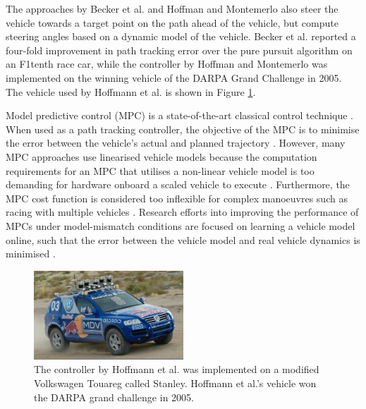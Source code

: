 The approaches by Becker et al. \cite{Becker2022} and Hoffman and Montemerlo \cite{Hoffmann2007} also steer the vehicle towards a target point on the path ahead of the vehicle, but compute steering angles based on a dynamic model of the vehicle.
Becker et al. \cite{Becker2022} reported a four-fold improvement in path tracking error over the pure pursuit algorithm on an F1tenth race car, while the controller by Hoffman and Montemerlo \cite{Hoffmann2007} was implemented on the winning vehicle of the DARPA Grand Challenge in 2005.
The vehicle used by Hoffmann et al.  \cite{Hoffmann2007} is shown in Figure \ref{fig:stanley}.

Model predictive control (MPC) is a state-of-the-art classical control technique \cite{Tatulea-Codrean2020, Beal2013, Achin2021, Williams2016, Liniger2019, Brunner2018a}.
When used as a path tracking controller, the objective of the MPC is to minimise the error between the vehicle's actual and planned trajectory \cite{Liniger2019}.
However, many MPC approaches use linearised vehicle models \cite{Beal2013} because the computation requirements for an MPC that utilises a non-linear vehicle model is too demanding for hardware onboard a scaled vehicle to execute \cite{Tatulea-Codrean2020}.
Furthermore, the MPC cost function is considered too inflexible for complex manoeuvres such as racing with multiple vehicles \cite{Fuchs2021}.
Research efforts into improving the performance of MPCs under model-mismatch conditions are focused on learning a vehicle model online, such that the error between the vehicle model and real vehicle dynamics is minimised \cite{Tatulea-Codrean2020, Brunner2018a}.


\begin{figure}[htb!]
    \centering
    \includegraphics[width=0.5\textwidth]{contents/chapt2/figs/stanley.jpg}
    \caption[The Stanley vehicle]{The controller by Hoffmann et al. \cite{Hoffmann2007} was implemented on a modified Volkswagen Touareg called Stanley. Hoffmann et al.'s vehicle won the DARPA grand challenge in 2005.}
    \label{fig:stanley}
\end{figure}


